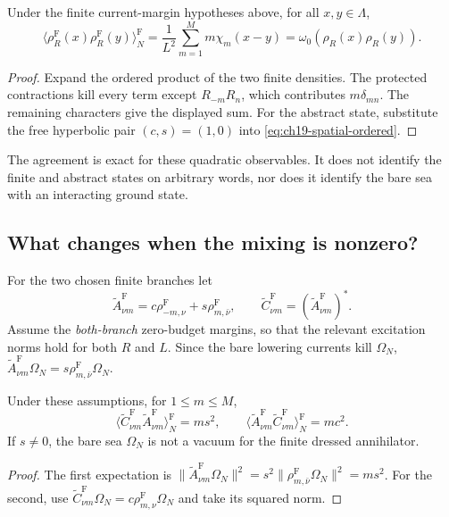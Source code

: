 \begin{theorem}
\label{thm:ch19-comp-free-kernel}
Under the finite current-margin hypotheses above, for all
$x,y\in\Lambda$,
\begin{equation}
 \boxed{\displaystyle
 \langle\rho_R^{\mathrm F}(x)\rho_R^{\mathrm F}(y)
 \rangle^{\mathrm F}_N
 =\frac1{L^2}\sum_{m=1}^{M}m\chi_m(x-y)
 =\omega_0(\rho_R(x)\rho_R(y)).}
 \label{eq:ch19-comp-fock-kernel}
\end{equation}
\end{theorem}
\begin{proof}
Expand the ordered product of the two finite densities.
The protected contractions kill every term except
$R_{-m}R_n$, which contributes $m\delta_{mn}$.  The remaining
characters give the displayed sum.  For the abstract state,
substitute the free hyperbolic pair $(c,s)=(1,0)$ into
\eqref{eq:ch19-spatial-ordered}.
\end{proof}

The agreement is exact for these quadratic observables.  It does
not identify the finite and abstract states on arbitrary words,
nor does it identify the bare sea with an interacting ground state.

\subsection*{What changes when the mixing is nonzero?}

For the two chosen finite branches let
\begin{equation}
 \widetilde A_{\nu m}^{\mathrm F}
   =c\rho_{-m,\nu}^{\mathrm F}
     +s\rho_{m,\bar\nu}^{\mathrm F},
 \qquad
 \widetilde C_{\nu m}^{\mathrm F}
   =(\widetilde A_{\nu m}^{\mathrm F})^*.
 \label{eq:ch19-comp-dressed-ann}
\end{equation}
Assume the \emph{both-branch} zero-budget margins, so that the
relevant excitation norms hold for both $R$ and $L$.  Since the
bare lowering currents kill $\Omega_N$,
$\widetilde A_{\nu m}^{\mathrm F}\Omega_N
=s\rho_{m,\bar\nu}^{\mathrm F}\Omega_N$.

\begin{proposition}
\label{prop:ch19-comp-dressed-number}
Under these assumptions, for $1\leq m\leq M$,
\begin{equation}
 \langle\widetilde C_{\nu m}^{\mathrm F}
           \widetilde A_{\nu m}^{\mathrm F}\rangle_N^{\mathrm F}
   =ms^2,
 \qquad
 \langle\widetilde A_{\nu m}^{\mathrm F}
           \widetilde C_{\nu m}^{\mathrm F}\rangle_N^{\mathrm F}
   =mc^2.
 \label{eq:ch19-comp-dressed-ca}
\end{equation}
If $s\ne0$, the bare sea $\Omega_N$ is not a vacuum for the
finite dressed annihilator.
\end{proposition}
\begin{proof}
The first expectation is
$\|\widetilde A_{\nu m}^{\mathrm F}\Omega_N\|^2
=s^2\|\rho_{m,\bar\nu}^{\mathrm F}\Omega_N\|^2=ms^2$.
For the second, use
$\widetilde C_{\nu m}^{\mathrm F}\Omega_N
=c\rho_{m,\nu}^{\mathrm F}\Omega_N$ and take its squared norm.
\end{proof}


